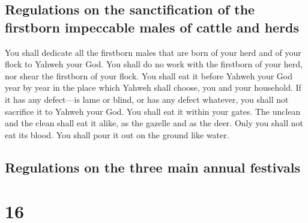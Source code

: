\hypertarget{regulations-on-the-sanctification-of-the-firstborn-impeccable-males-of-cattle-and-herds}{%
\subsection{Regulations on the sanctification of the firstborn
impeccable males of cattle and
herds}\label{regulations-on-the-sanctification-of-the-firstborn-impeccable-males-of-cattle-and-herds}}

 You shall dedicate all the firstborn males that are born
of your herd and of your flock to Yahweh your God. You shall do no work
with the firstborn of your herd, nor shear the firstborn of your flock.
 You shall eat it before Yahweh your God year by year in
the place which Yahweh shall choose, you and your household.
 If it has any defect---is lame or blind, or has any
defect whatever, you shall not sacrifice it to Yahweh your God.
 You shall eat it within your gates. The unclean and the
clean shall eat it alike, as the gazelle and as the deer.
 Only you shall not eat its blood. You shall pour it out
on the ground like water.

\hypertarget{regulations-on-the-three-main-annual-festivals}{%
\subsection{Regulations on the three main annual
festivals}\label{regulations-on-the-three-main-annual-festivals}}

\hypertarget{section-15}{%
\section{16}\label{section-15}}

